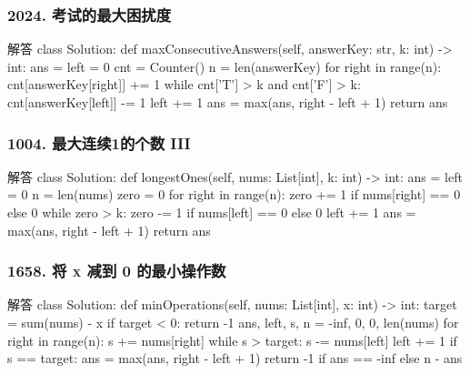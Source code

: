 \begin{frame}[fragile]          %
  \frametitle{\textsc{2024. 考试的最大困扰度}}
  \begin{codeblock}[language=python]{解答}
class Solution:
  def maxConsecutiveAnswers(self, answerKey: str, k: int) -> int:
    ans = left = 0
    cnt = Counter()
    n = len(answerKey)
    for right in range(n):
        cnt[answerKey[right]] += 1
        while cnt['T'] > k and cnt['F'] > k:
            cnt[answerKey[left]] -= 1
            left += 1
        ans = max(ans, right - left + 1)
    return ans
  \end{codeblock}
\end{frame}

\begin{frame}[fragile]          %
  \frametitle{\textsc{1004. 最大连续1的个数 III}}
  \begin{codeblock}[language=python]{解答}
class Solution:
  def longestOnes(self, nums: List[int], k: int) -> int:
    ans = left = 0
    n = len(nums)
    zero = 0
    for right in range(n):
        zero += 1 if nums[right] == 0 else 0
        while zero > k:
            zero -= 1 if nums[left] == 0 else 0
            left += 1
        ans = max(ans, right - left + 1)
    return ans
  \end{codeblock}
\end{frame}

\begin{frame}[fragile]          %
  \frametitle{\textsc{1658. 将 x 减到 0 的最小操作数}}
  \begin{codeblock}[language=python]{解答}
class Solution:
  def minOperations(self, nums: List[int], x: int) -> int:
    target = sum(nums) - x
    if target < 0:
        return -1
    ans, left, s, n = -inf, 0, 0, len(nums)
    for right in range(n):
        s += nums[right]
        while s > target:
            s -= nums[left]
            left += 1
        if s == target:
            ans = max(ans, right - left + 1)
    return -1 if ans == -inf else n - ans
  \end{codeblock}
\end{frame}

